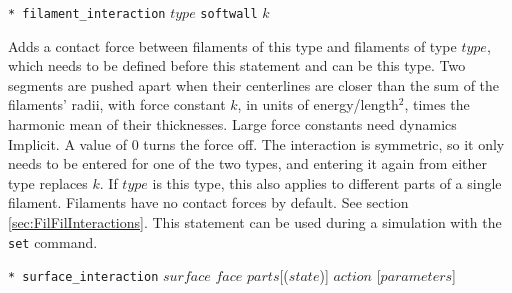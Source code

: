 \documentclass {scrbook}
\newcommand {\ttt} {\texttt}
\begin{document}
\begin{description}
\item{\ttt{* filament\_interaction} $type$ \ttt{softwall} $k$}

Adds a contact force between filaments of this type and filaments of type $type$, which needs to be defined before this statement and can be this type. Two segments are pushed apart when their centerlines are closer than the sum of the filaments' radii, with force constant $k$, in units of energy/length$^2$, times the harmonic mean of their thicknesses. Large force constants need dynamics Implicit. A value of 0 turns the force off. The interaction is symmetric, so it only needs to be entered for one of the two types, and entering it again from either type replaces $k$. If $type$ is this type, this also applies to different parts of a single filament. Filaments have no contact forces by default. See section \ref{sec:FilFilInteractions}. This statement can be used during a simulation with the \ttt{set} command.

\item{\ttt{* surface\_interaction} $surface$ $face$ $parts$[($state$)] $action$ [$parameters$]}


\end{description}
\end{document}
